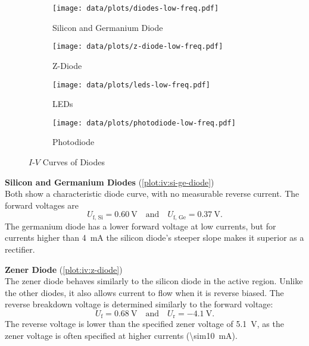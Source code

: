 \begin{figure}[tbp]
	\centering

	\begin{subfigure}{\ivsubfigwidth}
		\centering
		\texttt{[image: data/plots/diodes-low-freq.pdf]}
		\caption{Silicon and Germanium Diode}
		\label{plot:iv:si-ge-diode}
	\end{subfigure}
	\begin{subfigure}{\ivsubfigwidth}
		\centering
		\texttt{[image: data/plots/z-diode-low-freq.pdf]}
		\caption{Z-Diode}
		\label{plot:iv:z-diode}
	\end{subfigure}

%

	\begin{subfigure}{\ivsubfigwidth}
		\centering
		\texttt{[image: data/plots/leds-low-freq.pdf]}
		\caption{LEDs}
		\label{plot:iv:leds}
	\end{subfigure}
	\begin{subfigure}{\ivsubfigwidth}
		\centering
		\texttt{[image: data/plots/photodiode-low-freq.pdf]}
		\caption{Photodiode}
		\label{plot:iv:photodiode}
	\end{subfigure}

	\caption{$I$-$V$ Curves of Diodes}
	\label{plot:iv:diodes}
\end{figure}

\textbf{Silicon and Germanium Diodes} (\autoref{plot:iv:si-ge-diode})\\
Both show a characteristic diode curve, with no measurable reverse current.
The forward voltages are
\begin{equation*}
	U_\text{f, Si} = \SI{0.60}{\volt} \quad \text{and} \quad U_\text{f, Ge} = \SI{0.37}{\volt}.
\end{equation*}
The germanium diode has a lower forward voltage at low currents, but for currents higher than \SI{4}{\mA} the silicon diode's steeper slope makes it superior as a rectifier.

\textbf{Zener Diode} (\autoref{plot:iv:z-diode})\\
The zener diode behaves similarly to the silicon diode in the active region.
Unlike the other diodes, it also allows current to flow when it is reverse biased.
The reverse breakdown voltage is determined similarly to the forward voltage:
\begin{equation*}
	U_\text{f} = \SI{0.68}{\volt} \quad \text{and} \quad U_\text{r} = \SI{-4.1}{\volt}.
\end{equation*}
The reverse voltage is lower than the specified zener voltage of \SI{5.1}{\volt}, as the zener voltage is often specified at higher currents (\SI{\sim10}{\mA}).

